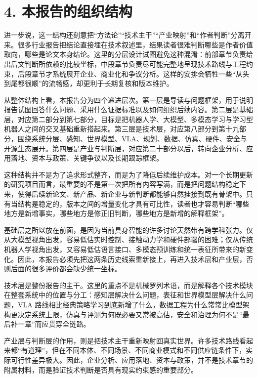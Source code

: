 \section*{4. 本报告的组织结构}

进一步说，这一结构还刻意把“方法论”“技术主干”“产业映射”和“作者判断”分离开来。很多行业报告把结论直接埋在技术叙述里，结果读者很难判断哪些是作者价值取向，哪些是论文本身结论。这里的分层设计试图避免这种混淆：前部章节负责给出后文判断所依赖的比较坐标，中段章节负责尽可能完整地呈现技术路线与工程约束，后段章节才系统展开企业、商业化和争议分析。这样的安排会牺牲一些“从头到尾都很顺”的流畅感，却更利于长期复核和版本维护。

从整体结构上看，本报告分为四个递进层次。第一层是导读与问题框架，用于说明报告试图回答什么问题、采用什么证据标准以及如何组织后续内容。第二层是基础层，对应第二部分到第七部分，目标是把机器人学、大模型、多模态学习与学习型机器人之间的交叉基础重新搭起来。第三层是技术层，对应第八部分到第十九部分，围绕系统分层、感知、世界模型、VLA、规划、数据、仿真、硬件、安全与开源生态展开。第四层是产业与判断层，对应第二十部分以后，转向企业分析、应用落地、资本与政策、关键争议以及长期跟踪框架。

这种结构并不是为了追求形式整齐，而是为了降低后续维护成本。对一个长期更新的研究项目而言，最重要的不是第一次把所有内容写满，而是把问题结构稳定下来，使得后续新论文、新产品、新企业与新判断都能够自然挂接到既有骨架中。只有当结构是稳定的，版本之间的增量变化才具有可比性，读者也才容易判断“哪些地方是新增事实，哪些地方是修正旧判断，哪些地方是新增的解释框架”。

基础层之所以放在前面，是因为当前具身智能的许多讨论天然带有跨学科张力。仅从大模型视角出发，容易低估实时控制、接触动力学和硬件部署的困难；仅从传统机器人学视角出发，又容易低估语言接口、多模态预训练和统一表征所带来的新变化。因此，本报告必须先把这两条历史线索重新接上，再进入技术层和产业层，否则后面的很多评价都会缺少统一坐标。

技术层是整份报告的主干。这里的重点不是机械罗列术语，而是解释各个技术模块在整套系统中的位置与分工：感知层解决什么问题，表征和世界模型层解决什么问题，VLA 路线相比经典策略学习到底新增了什么，数据工程为什么常常比模型架构更决定系统上限，仿真与评测为何既必要又常被高估，安全和治理为何不是“最后补一章”而应贯穿全链路。

产业层与判断层的作用，则是把技术主干重新映射回真实世界。许多技术路线看起来都“有道理”，但在不同本体、不同场景、不同商业模式和不同供应链条件下，实际可行性差异极大。因此，企业分析、应用落地、资本与政策，并不是技术章节的附属材料，而是验证技术判断是否具有现实约束感的重要部分。

